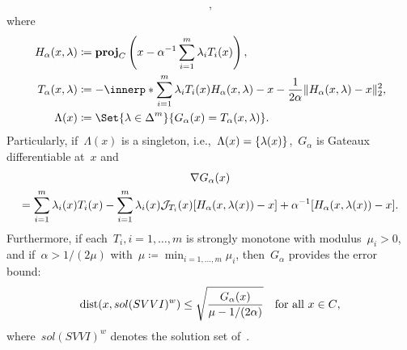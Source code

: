 \documentclass[../../main]{subfiles}
\begin{document}
\begin{example}
\begin{description}
\begin{multline}
                ,\end{multline}
            where
            \begin{align}
                H_\alpha(x, \lambda) & \coloneqq \proj_C\left( x - \alpha^{-1} \sum_{i = 1}^{m} \lambda_i T_i(x) \right),                                                          \\
                T_\alpha(x, \lambda) & \coloneqq - \innerp*{\sum_{i = 1}^{m} \lambda_i T_i(x)}{H_\alpha(x, \lambda) - x} - \frac{1}{2 \alpha} \norm{H_\alpha(x, \lambda) - x}_2^2, \\
                \Lambda(x)           & \coloneqq \Set{\lambda \in \simplex^m}{G_\alpha(x) = T_\alpha(x, \lambda)}
                .\end{align}
            Particularly, if~$\Lambda(x)$ is a singleton, i.e.,~$\Lambda(x) = \lbrace\lambda(x)\rbrace$,~$G_\alpha$ is Gateaux differentiable at~$x$ and
            \begin{multline}
                \nabla G_\alpha(x) \\
                = \sum_{i = 1}^{m} \lambda_i(x) T_i(x) - \sum_{i = 1}^{m} \lambda_i(x) \mathcal{J}_{T_i}(x) [H_\alpha(x, \lambda(x)) - x] + \alpha^{-1} [H_\alpha(x, \lambda(x)) - x]
                .\end{multline}
            Furthermore, if each~$T_i, i = 1, \dots, m$ is strongly monotone with modulus~$\mu_i > 0$, and if~$\alpha > 1 / (2 \mu)$ with~$\mu \coloneqq \min_{i = 1, \dots, m} \mu_i$, then~$G_\alpha$ provides the error bound:
            \begin{equation}
                \operatorname{dist}(x, sol(SVVI)^w) \le \sqrt{\frac{G_\alpha(x)}{\mu - 1 / (2 \alpha)}} \quad \text{for all~$x \in C$}
                ,\end{equation}
            where~$sol(SVVI)^w$ denotes the solution set of~.
    \end{description}
\end{example}
\end{document}
